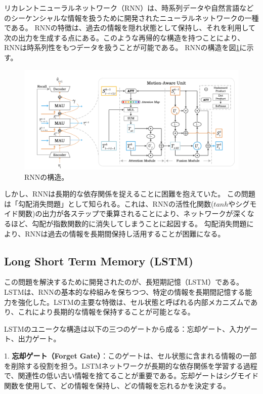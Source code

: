     リカレントニューラルネットワーク（RNN）は、時系列データや自然言語などのシーケンシャルな情報を扱うために開発されたニューラルネットワークの一種である。
    RNNの特徴は、過去の情報を隠れ状態として保持し、それを利用して次の出力を生成する点にある。このような再帰的な構造を持つことにより、RNNは時系列性をもつデータを扱うことが可能である。
    RNNの構造を図\ref{fig:rnn}に示す。
    \begin{figure}[htpb]
      \centering
      \includegraphics[width=\textwidth]{figures/mau.png}
      \caption{RNNの構造。}
      \label{fig:rnn}
    \end{figure}

    しかし、RNNは長期的な依存関係を捉えることに困難を抱えていた。
    この問題は「勾配消失問題」として知られる。これは、RNNの活性化関数(\(tanh\)やシグモイド関数)の出力が各ステップで乗算されることにより、ネットワークが深くなるほど、勾配が指数関数的に消失してしまうことに起因する。
    勾配消失問題により、RNNは過去の情報を長期間保持し活用することが困難になる。
    
    \subsection{Long Short Term Memory (LSTM)}
    この問題を解決するために開発されたのが、長短期記憶（LSTM）である。LSTMは、RNNの基本的な枠組みを保ちつつ、特定の情報を長期間記憶する能力を強化した。LSTMの主要な特徴は、セル状態と呼ばれる内部メカニズムであり、これにより長期的な情報を保持することが可能となる。
    
    LSTMのユニークな構造は以下の三つのゲートから成る：忘却ゲート、入力ゲート、出力ゲート。
    
    1. \textbf{忘却ゲート（Forget Gate）}：このゲートは、セル状態に含まれる情報の一部を削除する役割を担う。LSTMネットワークが長期的な依存関係を学習する過程で、関連性の低い古い情報を捨てることが重要である。忘却ゲートはシグモイド関数を使用して、どの情報を保持し、どの情報を忘れるかを決定する。
   
